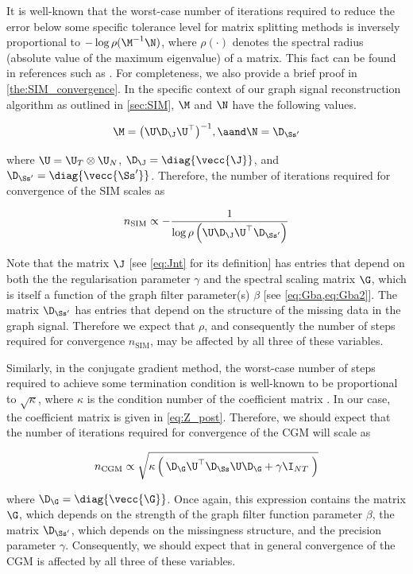 It is well-known that the worst-case number of iterations required to reduce the error below some specific tolerance level for matrix splitting methods is inversely proportional to $-\log \rho(\M^{-1}\N)$, where $\rho(\cdot)$ denotes the spectral radius (absolute value of the maximum eigenvalue) of a matrix. This fact can be found in references such as \cite{Demmel1997}. For completeness, we also provide a brief proof in \cref{the:SIM_convergence}. In the specific context of our graph signal reconstruction algorithm as outlined in \cref{sec:SIM}, $\M$ and $\N$ have the following values.  


$$
\M = \big(\U \D_\J \U^\top\big)^{-1}, \aand \N = \D_{\Ss'}
$$

where  $\U = \U_T \otimes \U_N$, $\D_\J = \diag{\vecc{\J}}$, and $\D_{\Ss'} = \diag{\vecc{\Ss'}}$. Therefore, the number of iterations required for convergence of the SIM scales as


\begin{equation}
    \label{eq:n_SIM}
    n_\text{SIM} \propto  -\frac{1}{\log\rho\left(\U \D_\J \U^\top \D_{\Ss'} \right)}
\end{equation}

Note that the matrix $\J$ [see \cref{eq:Jnt} for its definition] has entries that depend on both the the regularisation parameter $\gamma$ and the spectral scaling matrix $\G$, which is itself a function of the graph filter parameter(s) $\beta$ [see \cref{eq:Gba,eq:Gba2}]. The matrix $\D_{\Ss'}$  has entries that depend on the structure of the missing data in the graph signal. Therefore we expect that $\rho$, and consequently the number of steps required for convergence $n_\text{SIM}$, may be affected by all three of these variables.  

Similarly, in the conjugate gradient method, the worst-case number of steps required to achieve some termination condition is well-known to be proportional to $\sqrt{\kappa}$, where $\kappa$ is the condition number of the coefficient matrix \cite{Kelley1995}. In our case, the coefficient matrix is given in \cref{eq:Z_post}. Therefore, we should expect that the number of iterations required for convergence of the CGM will scale as

\begin{equation}
    \label{eq:n_CGM}
     n_\text{CGM} \propto \sqrt{\kappa \left(  \, \D_\G \U^\top \D_{\Ss} \U \D_\G + \gamma \I_{NT} \; \right)}
\end{equation}

where $\D_\G = \diag{\vecc{\G}}$. Once again, this expression contains the matrix $\G$, which depends on the strength of the graph filter function parameter $\beta$, the matrix $\D_{\Ss'}$, which depends on the missingness structure, and the precision parameter $\gamma$. Consequently, we should expect that in general convergence of the CGM is affected by all three of these variables. 

